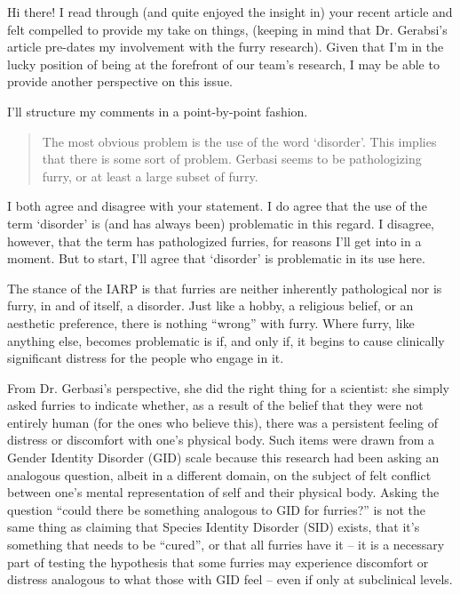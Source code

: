 
Hi there! I read through (and quite enjoyed the insight in) your recent article and felt compelled to provide my take on things, (keeping in mind that Dr. Gerabsi's article pre-dates my involvement with the furry research). Given that I'm in the lucky position of being at the forefront of our team's research, I may be able to provide another perspective on this issue.

I'll structure my comments in a point-by-point fashion.

\begin{quote}
  The most obvious problem is the use of the word `disorder'. This implies that there is some sort of problem. Gerbasi seems to be pathologizing furry, or at least a large subset of furry.
\end{quote}

I both agree and disagree with your statement. I do agree that the use of the term `disorder' is (and has always been) problematic in this regard. I disagree, however, that the term has pathologized furries, for reasons I'll get into in a moment. But to start, I'll agree that `disorder' is problematic in its use here.

The stance of the IARP is that furries are neither inherently pathological nor is furry, in and of itself, a disorder. Just like a hobby, a religious belief, or an aesthetic preference, there is nothing ``wrong'' with furry. Where furry, like anything else, becomes problematic is if, and only if, it begins to cause clinically significant distress for the people who engage in it.

From Dr. Gerbasi's perspective, she did the right thing for a scientist: she simply asked furries to indicate whether, as a result of the belief that they were not entirely human (for the ones who believe this), there was a persistent feeling of distress or discomfort with one's physical body. Such items were drawn from a Gender Identity Disorder (GID) scale because this research had been asking an analogous question, albeit in a different domain, on the subject of felt conflict between one's mental representation of self and their physical body. Asking the question ``could there be something analogous to GID for furries?'' is not the same thing as claiming that Species Identity Disorder (SID) exists, that it's something that needs to be ``cured'', or that all furries have it -- it is a necessary part of testing the hypothesis that some furries may experience discomfort or distress analogous to what those with GID feel -- even if only at subclinical levels.

